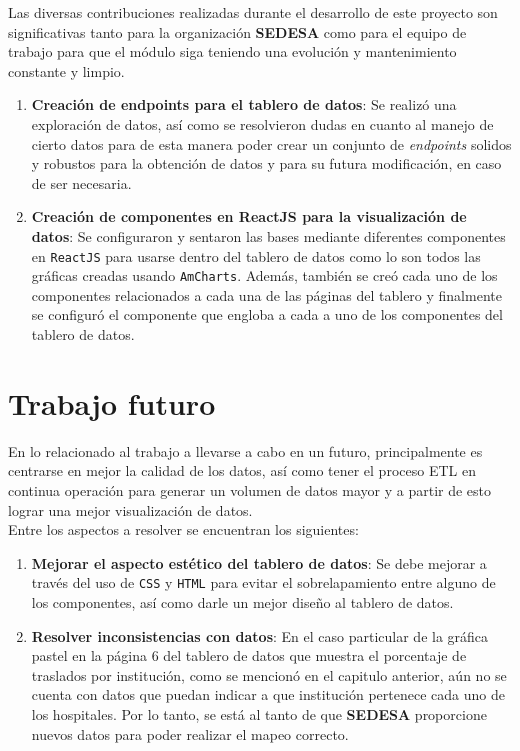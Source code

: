 Las diversas contribuciones realizadas durante el desarrollo de este proyecto son significativas tanto para la organización \textbf{SEDESA} como para el equipo de trabajo para que el módulo siga teniendo una evolución y mantenimiento constante y limpio.

\begin{enumerate}
    \item \textbf{Creación de endpoints para el tablero de datos}: Se realizó una exploración de datos, así como se resolvieron dudas en cuanto al manejo de cierto datos para de esta manera poder crear un conjunto de \textit{endpoints} solidos y robustos para la obtención de datos y para su futura modificación, en caso de ser necesaria.

    \item \textbf{Creación de componentes en ReactJS para la visualización de datos}: Se configuraron y sentaron las bases mediante diferentes componentes en \texttt{ReactJS} para usarse dentro del tablero de datos como lo son todos las gráficas creadas usando \texttt{AmCharts}. Además, también se creó cada uno de los componentes relacionados a cada una de las páginas del tablero y finalmente se configuró el componente que engloba a cada a uno de los componentes del tablero de datos.
\end{enumerate}

\section{Trabajo futuro}

En lo relacionado al trabajo a llevarse a cabo en un futuro, principalmente es centrarse en mejor la calidad de los datos, así como tener el proceso ETL en continua operación para generar un volumen de datos mayor y a partir de esto lograr una mejor visualización de datos.\\

Entre los aspectos a resolver se encuentran los siguientes:
\begin{enumerate}
    \item \textbf{Mejorar el aspecto estético del tablero de datos}: Se debe mejorar a través del uso de \texttt{CSS} y \texttt{HTML} para evitar el sobrelapamiento entre alguno de los componentes, así como darle un mejor diseño al tablero de datos.

    \item \textbf{Resolver inconsistencias con datos}: En el caso particular de la gráfica pastel en la página 6 del tablero de datos que muestra el porcentaje de traslados por institución, como se mencionó en el capitulo anterior, aún no se cuenta con datos que puedan indicar a que institución pertenece cada uno de los hospitales. Por lo tanto, se está al tanto de que \textbf{SEDESA} proporcione nuevos datos para poder realizar el mapeo correcto.
\end{enumerate}


